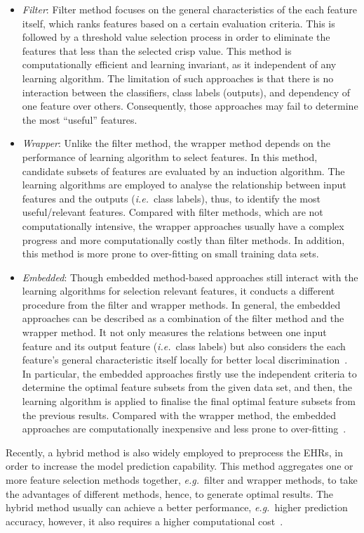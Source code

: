 \documentclass{article}
\newcommand{\zzie}{\emph{i.e.}~}
\newcommand{\zzeg}{\emph{e.g.}~}
\newcommand*{\1}{\textcolor{red}}
\begin{document}
\begin{itemize}
	\item \textit{Filter}: Filter method focuses on the general characteristics of the each feature itself, which ranks features based on a certain evaluation criteria. This is followed by a threshold value selection process in order to eliminate the features that less than the selected crisp value. This method is computationally efficient and learning invariant, as it independent of any learning algorithm. The limitation of such approaches is that there is no interaction between the classifiers, class labels (outputs), and dependency of one feature over others. Consequently, those approaches may fail to determine the most ``useful'' features. 
	\item \textit{Wrapper}: Unlike the filter method, the wrapper method depends on the performance of learning algorithm to select features. In this method, candidate subsets of features are evaluated by an induction algorithm. The learning algorithms are employed to analyse the relationship between input features and the outputs (\zzie class labels), thus, to identify the most useful/relevant features. Compared with filter methods, which are not computationally intensive, the wrapper approaches usually have a complex progress and more computationally costly than filter methods. In addition, this method is more prone to over-fitting on small training data sets. 
	\item \textit{Embedded}: Though embedded method-based approaches still interact with the learning algorithms for selection relevant features, it conducts a different procedure from the filter and wrapper methods. In general, the embedded approaches can be described as a combination of the filter method and the wrapper method. It not only measures the relations between one input feature and its output feature (\zzie class labels) but also considers the each feature's general characteristic itself locally for better local discrimination~\cite{ang2015supervised}. In particular, the embedded approaches firstly use the independent criteria to determine the optimal feature subsets from the given data set, and then, the learning algorithm is applied to finalise the final optimal feature subsets from the previous results. Compared with the wrapper method, the embedded approaches are computationally inexpensive and less prone to over-fitting~\cite{ang2015supervised}. 
\end{itemize}

Recently, a hybrid method is also widely employed to preprocess the EHRs, in order to increase the model prediction capability. This method aggregates one or more feature selection methods together, \zzeg filter and wrapper methods, to take the advantages of different methods, hence, to generate optimal results. The hybrid method usually can achieve a better performance, \zzeg higher prediction accuracy, however, it also requires a higher computational cost~\cite{jain2018feature}.
\end{document}
